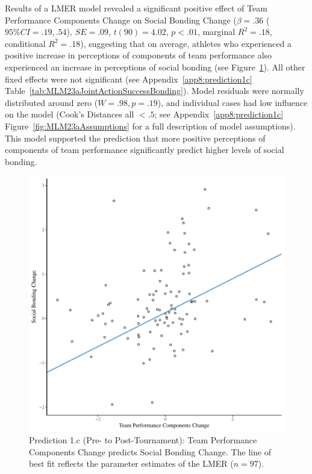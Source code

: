 \begin{CJK}{UTF8}{gbsn}
Results of a LMER model revealed a significant positive effect of Team Performance Components Change on Social Bonding Change ($\beta = .36$ ($95\% CI =  .19, .54$), $SE = .09$, $t(90) = 4.02$, $p < .01$, marginal $R^2 = .18$, conditional $R^2 = .18$), suggesting that on average, athletes who experienced a positive increase in perceptions of components of team performance also experienced an increase in perceptions of social bonding (see Figure~\ref{fig:jasBondDeltaModelSlope}). All other fixed effects were not significant (see Appendix~\ref{app8:prediction1c} Table~\ref{tab:MLM23aJointActionSuccessBonding}). Model residuals were normally distributed around zero ($W = .98, p = .19$), and individual cases had low influence on the model (Cook's Distances all $< .5$; see Appendix~\ref{app8:prediction1c} Figure~\ref{fig:MLM23aAssumptions} for a full description of model assumptions).  This model supported the prediction that more positive perceptions of components of team performance significantly predict higher levels of social bonding.






  \begin{figure}[htbp]
    \centering
  \includegraphics[scale=.5]{images/jasBondDeltaModelSlope.pdf}
    \caption{Prediction 1.c (Pre- to Post-Tournament): Team Performance Components Change predicts Social Bonding Change. The line of best fit reflects the parameter estimates of the LMER ($n = 97$).}
    \label{fig:jasBondDeltaModelSlope}
  \end{figure}





\end{CJK}
